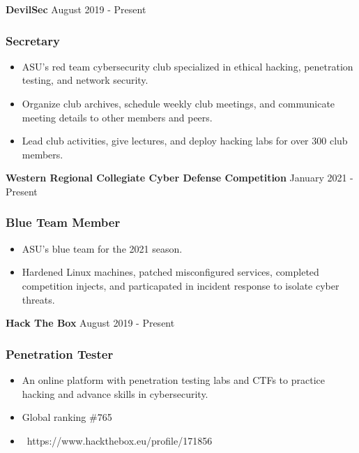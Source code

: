 \documentclass{article}
\newcommand{\resumesubsection}[2]{
	\noindent \textbf{#1} \hfill #2
}
\begin{document}
\resumesubsection{DevilSec}{August 2019 - Present}
\subsubsection{Secretary}
\begin{itemize}[noitemsep, topsep=0pt] 
	\item ASU's red team cybersecurity club specialized in ethical hacking, penetration testing, and network security.
\end{itemize}
\begin{itemize}[noitemsep, topsep=0pt]
	\item Organize club archives, schedule weekly club meetings, and communicate meeting details to other members and peers.
	\item Lead club activities, give lectures, and deploy hacking labs for over 300 club members.
\end{itemize}

\resumesubsection{Western Regional Collegiate Cyber Defense Competition}{January 2021 - Present}
\subsubsection{Blue Team Member}
\begin{itemize}[noitemsep, topsep=0pt]
	\item ASU's blue team for the 2021 season.
	\item Hardened Linux machines, patched misconfigured services, completed competition injects, and particapated in incident response to isolate cyber threats.
\end{itemize}

\resumesubsection{Hack The Box}{August 2019 - Present}
\subsubsection{Penetration Tester}
\begin{itemize}[noitemsep, topsep=0pt]
	\item An online platform with penetration testing labs and CTFs to practice hacking and advance skills in cybersecurity.
    \item Global ranking \#765
	\item \faCube \ https://www.hackthebox.eu/profile/171856
\end{itemize}
\end{document}
